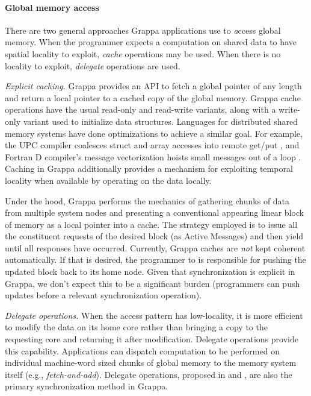 \paragraph{Global memory access} There are two general approaches
Grappa applications use to {\emph access} global memory. When the
programmer expects a computation on shared data to have spatial locality
to exploit, {\em cache} operations may be used. When there is no
locality to exploit, {\em delegate} operations are used.

\textit{Explicit caching.} Grappa provides an API to fetch a global pointer of
any length and return a local pointer to a cached copy of the global memory.
Grappa cache operations have the usual read-only and read-write variants,
along with a write-only variant used to initialize data structures. Languages
for distributed shared memory systems have done optimizations to achieve a
similar goal. For example, the UPC compiler coalesces struct and array
accesses into remote get/put \cite{Chen:2005}, and Fortran D compiler's
message vectorization hoists small messages out of a loop
\cite{FortranD:1992}. Caching in Grappa additionally provides a mechanism for
exploiting temporal locality when available by operating on the data locally.

Under the hood, Grappa performs the mechanics of gathering chunks of data from
multiple system nodes and presenting a conventional appearing linear block of
memory as a local pointer into a cache. The strategy employed is to issue all
the constituent requests of the desired block (as Active Messages) and then
yield until all responses have occurred. Currently, Grappa caches are
\emph{not} kept coherent automatically. If that is desired, the programmer to
is responsible for pushing the updated block back to its home node. Given that
synchronization is explicit in Grappa, we don't expect this to be a
significant burden (programmers can push updates before a relevant
synchronization operation).


\textit{Delegate operations.} When the access pattern has low-locality,
it is more efficient to modify the data on its home core rather than
bringing a copy to the requesting core and returning it after
modification. Delegate operations provide this capability. Applications
can dispatch computation to be performed on individual machine-word
sized chunks of global memory to the memory system itself (e.g.,
\emph{fetch-and-add}).  Delegate operations, proposed in
\cite{Nelson:hotpar11} and \cite{delegated:oopsla11}, are also the
primary synchronization method in Grappa.

